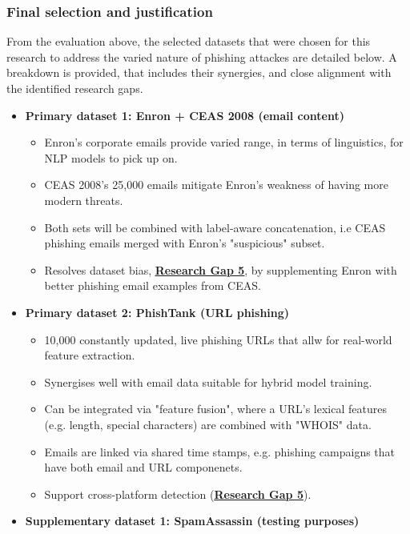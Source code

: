 
\subsubsection*{Final selection and justification}
From the evaluation above, the selected datasets that were chosen for this research to address the varied nature of phishing attackes are detailed below. A breakdown is provided, that includes their synergies, and close alignment with the identified research gaps.

\begin{itemize}
  \item \textbf{Primary dataset 1: Enron + CEAS 2008 (email content)}
  \begin{itemize}
    \item Enron's corporate emails provide varied range, in terms of linguistics, for NLP models to pick up on.
    \item CEAS 2008's 25,000 emails mitigate Enron's weakness of having more modern threats.
    \item Both sets will be combined with label-aware concatenation, i.e CEAS phishing emails merged with Enron's "suspicious" subset.
    \item Resolves dataset bias, \hyperref[research-gap-5]{\uline{\textbf{Research Gap 5}}}, by supplementing Enron with better phishing email examples from CEAS.
  \end{itemize}
  \item \textbf{Primary dataset 2: PhishTank (URL phishing)}
  \begin{itemize}
    \item 10,000 constantly updated, live phishing URLs that allw for real-world feature extraction.
    \item Synergises well with email data suitable for hybrid model training.
    \item Can be integrated via "feature fusion", where a URL's lexical features (e.g. length, special characters) are combined with "WHOIS" data.
    \item Emails are linked via shared time stamps, e.g. phishing campaigns that have both email and URL componenets.
    \item Support cross-platform detection (\hyperref[research-gap-5]{\uline{\textbf{Research Gap 5}}}).
  \end{itemize}
  \item \textbf{Supplementary dataset 1: SpamAssassin (testing purposes)}

\end{itemize}
